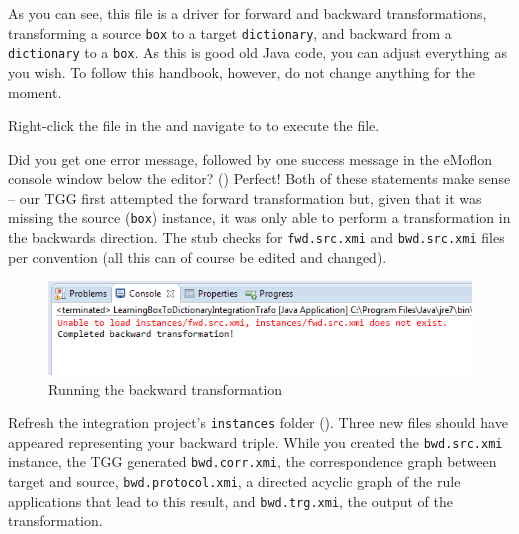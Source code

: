 \begin{stepbystep}
\item As you can see, this file is a driver for forward and backward transformations, transforming a source \texttt{box} to a target \texttt{dictionary}, and backward from a \texttt{dictionary} to a \texttt{box}. 
As this is good old Java code, you can adjust everything as you wish.
To follow this handbook, however, do not change anything for the moment.

\item Right-click the file in the  and navigate to  to execute the file.

\item Did you get one error message, followed by one success message in the eMoflon console window below
the editor? ()
Perfect!
Both of these statements make sense -- our TGG first attempted the forward transformation but, given that it was missing the source (\texttt{box}) instance, it was only able to perform a transformation in the backwards direction.
The stub checks for \texttt{fwd.src.xmi} and \texttt{bwd.src.xmi} files per convention (all this can of course be edited and changed).

\begin{figure}[htbp]
\begin{center}
  \includegraphics[width=\textwidth]{../../org.moflon.doc.handbook.04_tripleGraphTransformations/5_inAction/aImages/eclipse_TGGError}
  \caption{Running the backward transformation}
  \label{eclipse:tggERROR}
\end{center}
\end{figure}

\item Refresh the integration project's \texttt{instances} folder (). 
Three new  files should have appeared representing your backward triple. 
While you created the \texttt{bwd.src.xmi} instance, the TGG generated \texttt{bwd.corr.xmi}, the correspondence graph between target and source, \texttt{bwd.protocol.xmi}, a directed acyclic graph of the rule applications that lead to this result, and \texttt{bwd.trg.xmi}, the output of the transformation. 


\end{stepbystep}
